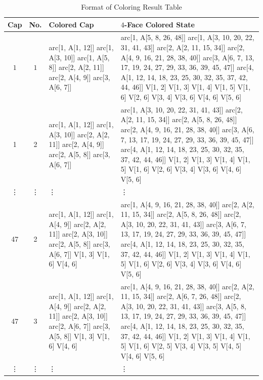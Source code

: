 \documentclass[12pt]{amsart}
\theoremstyle{definition}
\theoremstyle{remark}
\numberwithin{equation}{section}
\begin{document}
\begin{table}[H] \small
\begin{center}
\caption{Format of Coloring Result Table}
\label{tab:results}
\begin{tabular}{|c|c|p{55mm}|p{83mm}|}
\hline
Cap & No. & Colored Cap &  $4$-Face Colored State\\
\hline
$1$ & $1$ & arc[1, A[1, 12]] arc[1, A[3, 10]] arc[1, A[5, 8]] arc[2, 
  A[2, 11]] arc[2, A[4, 9]] arc[3, A[6, 7]] &  arc[1, A[5, 8, 26, 48]] arc[1, A[3, 10, 20, 22, 31, 41, 43]] arc[2, 
  A[2, 11, 15, 34]] arc[2, A[4, 9, 16, 21, 28, 38, 40]] arc[3, 
  A[6, 7, 13, 17, 19, 24, 27, 29, 33, 36, 39, 45, 47]] arc[4, 
  A[1, 12, 14, 18, 23, 25, 30, 32, 35, 37, 42, 44, 46]] V[1, 2] V[1, 
  3] V[1, 4] V[1, 5] V[1, 6] V[2, 6] V[3, 4] V[3, 6] V[4, 6] V[5, 6]\\
 
 \hline
 
1 & 2 & arc[1, A[1, 12]] arc[1, A[3, 10]] arc[2, A[2, 11]] arc[2, 
  A[4, 9]] arc[2, A[5, 8]] arc[3, A[6, 7]] &  arc[1, A[3, 10, 20, 22, 31, 41, 43]] arc[2, A[2, 11, 15, 34]] arc[2, 
  A[5, 8, 26, 48]] arc[2, A[4, 9, 16, 21, 28, 38, 40]] arc[3, 
  A[6, 7, 13, 17, 19, 24, 27, 29, 33, 36, 39, 45, 47]] arc[4, 
  A[1, 12, 14, 18, 23, 25, 30, 32, 35, 37, 42, 44, 46]] V[1, 2] V[1, 
  3] V[1, 4] V[1, 5] V[1, 6] V[2, 6] V[3, 4] V[3, 6] V[4, 6] V[5, 6]\\
  
 \hline

\vdots &\vdots & \vdots & \vdots\\

\hline

47 & 2 & arc[1, A[1, 12]] arc[1, A[4, 9]] arc[2, A[2, 11]] arc[2,  A[3, 10]] arc[2, A[5, 8]] arc[3, A[6, 7]] V[1, 3] V[1, 6] V[4, 6] & arc[1, A[4, 9, 16, 21, 28, 38, 40]] arc[2, A[2, 11, 15, 34]] arc[2, A[5, 8, 26, 48]] arc[2, A[3, 10, 20, 22, 31, 41, 43]] arc[3, A[6, 7, 13, 17, 19, 24, 27, 29, 33, 36, 39, 45, 47]] arc[4,  A[1, 12, 14, 18, 23, 25, 30, 32, 35, 37, 42, 44, 46]] V[1, 2] V[1, 3] V[1, 4] V[1, 5] V[1, 6] V[2, 6] V[3, 4] V[3, 6] V[4, 6] V[5, 6]\\
 
\hline

47 & 3 & arc[1, A[1, 12]] arc[1, A[4, 9]] arc[2, A[2, 11]] arc[2, 
  A[3, 10]] arc[2, A[6, 7]] arc[3, A[5, 8]] V[1, 3] V[1, 6] V[4, 6] & arc[1, A[4, 9, 16, 21, 28, 38, 40]] arc[2, A[2, 11, 15, 34]] arc[2, 
  A[6, 7, 26, 48]] arc[2, A[3, 10, 20, 22, 31, 41, 43]] arc[3, 
  A[5, 8, 13, 17, 19, 24, 27, 29, 33, 36, 39, 45, 47]] arc[4, 
  A[1, 12, 14, 18, 23, 25, 30, 32, 35, 37, 42, 44, 46]] V[1, 2] V[1, 
  3] V[1, 4] V[1, 5] V[1, 6] V[2, 5] V[3, 4] V[3, 5] V[4, 5] V[4, 
  6] V[5, 6]\\
 
\hline

\vdots & \vdots & \vdots & \vdots \\

\hline

\end{tabular}
\end{center}
\end{table}
\end{document}
